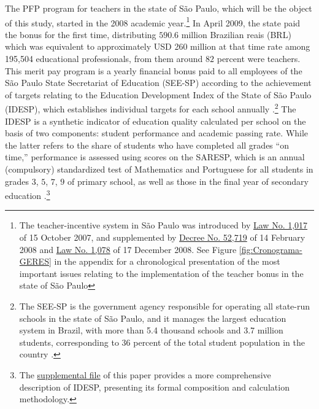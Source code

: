 \documentclass[a4paper, 12pt]{article}
\begin{document}
The PFP program for teachers in the state of São Paulo, which will be the object of this study, started in the 2008 academic year.\footnote{The teacher-incentive system in São Paulo was introduced by \href{http://tiny.cc/4opsaz}{Law No. 1,017} of 15 October 2007, and supplemented by \href{http://tiny.cc/ympsaz}{Decree No. 52,719} of 14 February 2008 and \href{http://tiny.cc/0wpsaz}{Law No. 1,078} of 17 December 2008. See Figure \ref{fig:Cronograma-GERES} in the appendix for a chronological presentation of the most important issues relating to the implementation of the teacher bonus in the state of São Paulo} In April 2009, the state paid the bonus for the first time, distributing $590.6$ million Brazilian reais (BRL) \textemdash which was equivalent to approximately USD 260 million at that time rate \textemdash among 195,504 educational professionals, from them around $82$ percent were teachers. This merit pay program is a yearly financial bonus paid to all employees of the São Paulo State Secretariat of Education (SEE-SP) according to the achievement of targets relating to the Education Development Index of the State of São Paulo (IDESP), which establishes individual targets for each school annually \citep{bresolin2018avaliaccao}.\footnote{The SEE-SP is the government agency responsible for operating all state-run schools in the state of São Paulo, and it manages the largest education system in Brazil, with more than 5.4 thousand schools and 3.7 million students, corresponding to $36$ percent of the total student population in the country \citep{Sinopse2018}.} The IDESP is a synthetic indicator of education quality calculated per school on the basis of two components: student performance and academic passing rate. While the latter refers to the share of students who have completed all grades ``on time,'' performance is assessed using scores on the SARESP, which is an annual (compulsory) standardized test of Mathematics and Portuguese for all students in grades $3$, $5$, $7$, $9$ of primary school, as well as those in the final year of secondary education \citep{oshiro2015impacto}.\footnote{The \hyperref[SuppMaterial]{supplemental file} of this paper provides a more comprehensive description of IDESP, presenting its formal composition and calculation methodology.}



\end{document}
